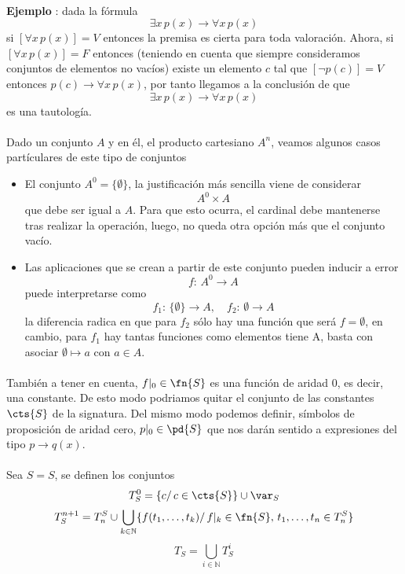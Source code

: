 \paragraph{}
\addtocounter{ej}{1} %
\textbf{Ejemplo }: dada la fórmula 
\[ \exists x\,  p(x) \rightarrow \forall x \, p(x) \]
si $[\forall x \, p(x)] =V$ entonces la premisa es cierta para toda valoración. Ahora, si $[\forall x \, p(x)] =F$ entonces (teniendo en cuenta que siempre consideramos conjuntos de elementos no vacíos) existe un elemento $c$ tal que $[\neg p(c)]=V$ entonces $p(c) \rightarrow \forall x \, p(x)$, por tanto llegamos a la conclusión de que 
\[ \exists x\,  p(x) \rightarrow \forall x \, p(x) \]
es una tautología. 
\paragraph{}
Dado un conjunto $A$ y en él, el producto cartesiano $A^n$, veamos algunos casos partículares de este tipo de conjuntos 
\begin{itemize}
	\item El conjunto $A^0=\{ \emptyset \}$, la justificación más sencilla viene de considerar \[ A^0 \times A \] que debe ser igual a $A$. Para que esto ocurra, el cardinal debe mantenerse tras realizar la operación, luego, no queda otra opción más que el conjunto vacío. 
	\item Las aplicaciones que se crean a partir de este conjunto pueden inducir a error
	\[ f: \, A^0 \rightarrow A  \]
	puede interpretarse como 
	\[ f_1: \, \{\emptyset\} \rightarrow A, \quad f_2:\, \emptyset \rightarrow A \]
	la diferencia radica en que para $f_2$ sólo hay una función que será $f=\emptyset$, en cambio, para $f_1$ hay tantas funciones como elementos tiene A, basta con asociar $\emptyset \mapsto a$ con $a \in A$.
\end{itemize}
\paragraph{}
También a tener en cuenta, $f\vert_{0} \in \fn{S}$ es una función de aridad 0, es decir, una constante. De esto modo podriamos quitar el conjunto de las constantes $\cts{S}$ de la signatura. Del mismo modo podemos definir, símbolos de proposición de aridad cero, $p\vert_{0} \in \pd{S}$ que nos darán sentido a expresiones del tipo $p \rightarrow q(x)$.
\paragraph{}
\begin{definition}
Sea $S=\si{S}$, se definen los conjuntos 
\[ T^0_S= \{ c / \, c \in \cts{S} \} \cup \var_S \]
\[ T^{n+1}_S= T_n^S \cup \bigcup_{k \in \mathbb{N}} \{ f(t_1, \ldots, t_k) / \, f\vert_{k} \in \fn{S},  \, t_1, \ldots, t_n \in T_n^S  \} \]
\[ T_S= \bigcup_{i \in \mathbb{N}}T^i_S \]
\end{definition}
